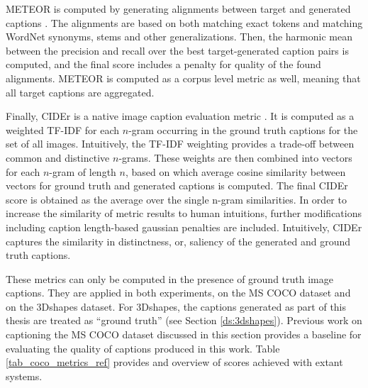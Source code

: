 
METEOR is computed by generating alignments between target and generated captions \parencite{banerjee2005meteor}. The alignments are based on both matching exact tokens and matching WordNet synonyms, stems and other generalizations. Then, the harmonic mean between the precision and recall over the best target-generated caption pairs is computed, and the final score includes a penalty for quality of the found alignments. METEOR is computed as a corpus level metric as well, meaning that all target captions are aggregated.
 
Finally, CIDEr is a native image caption evaluation metric \parencite{vedantam2015cider}. It is computed as a weighted TF-IDF for each $n$-gram occurring in the ground truth captions for the set of all images. Intuitively, the TF-IDF weighting provides a trade-off between common and distinctive $n$-grams. These weights are then combined into vectors for each $n$-gram of length $n$, based on which average cosine similarity between vectors for ground truth and generated captions is computed. The final CIDEr score is obtained as the average over the single n-gram similarities. In order to increase the similarity of metric results to human intuitions, further modifications including caption length-based gaussian penalties are included. Intuitively, CIDEr captures the similarity in distinctness, or, saliency of the generated and ground truth captions.

These metrics can only be computed in the presence of ground truth image captions. They are applied in both experiments, on the MS COCO dataset and on the 3Dshapes dataset. For 3Dshapes, the captions generated as part of this thesis are treated as ``ground truth'' (see Section \ref{ds:3dshapes}).
Previous work on captioning the MS COCO dataset discussed in this section provides a baseline for evaluating the quality of captions produced in this work. Table \ref{tab_coco_metrics_ref} provides and overview of scores achieved with extant systems.

